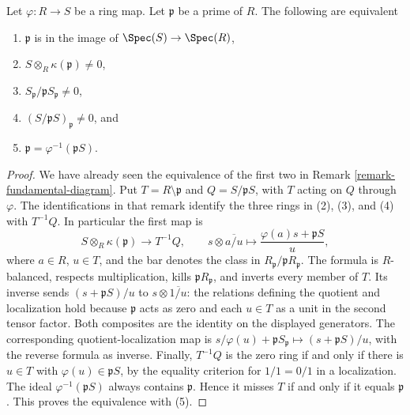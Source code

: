 \begin{lemma}
\label{lemma-in-image}
Let $\varphi : R \to S$ be a ring map. Let $\mathfrak p$
be a prime of $R$. The following are equivalent
\begin{enumerate}
\item $\mathfrak p$ is in the image of
$\Spec(S) \to \Spec(R)$,
\item $S \otimes_R \kappa(\mathfrak p) \not = 0$,
\item $S_{\mathfrak p}/\mathfrak p S_{\mathfrak p} \not = 0$,
\item $(S/\mathfrak pS)_{\mathfrak p} \not = 0$, and
\item $\mathfrak p = \varphi^{-1}(\mathfrak pS)$.
\end{enumerate}
\end{lemma}

\begin{proof}
We have already seen the equivalence of the first two
in Remark \ref{remark-fundamental-diagram}.
Put $T=R\setminus\mathfrak p$ and $Q=S/\mathfrak pS$, with
$T$ acting on $Q$ through $\varphi$.
The identifications in that remark identify the three rings in
(2), (3), and (4) with $T^{-1}Q$. In particular the first map is
$$
S\otimes_R\kappa(\mathfrak p)\longrightarrow T^{-1}Q,\qquad
s\otimes\overline{a/u}\longmapsto
\frac{\varphi(a)s+\mathfrak pS}{u},
$$
where $a\in R$, $u\in T$, and the bar denotes the class in
$R_{\mathfrak p}/\mathfrak pR_{\mathfrak p}$.
The formula is $R$-balanced, respects multiplication, kills
$\mathfrak pR_{\mathfrak p}$, and inverts every member of $T$.
Its inverse sends $(s+\mathfrak pS)/u$ to
$s\otimes\overline{1/u}$: the relations defining the quotient
and localization hold because $\mathfrak p$ acts as zero and
each $u\in T$ as a unit in the second tensor factor.
Both composites are the identity on the displayed generators.
The corresponding quotient-localization map is
$s/\varphi(u)+\mathfrak pS_{\mathfrak p}\mapsto
(s+\mathfrak pS)/u$, with the reverse formula as inverse.
Finally, $T^{-1}Q$ is the zero ring if and only if there is
$u\in T$ with $\varphi(u)\in\mathfrak pS$, by the equality
criterion for $1/1=0/1$ in a localization.
The ideal $\varphi^{-1}(\mathfrak pS)$ always contains
$\mathfrak p$. Hence it misses $T$ if and only if it equals
$\mathfrak p$. This proves the equivalence with (5).
\end{proof}